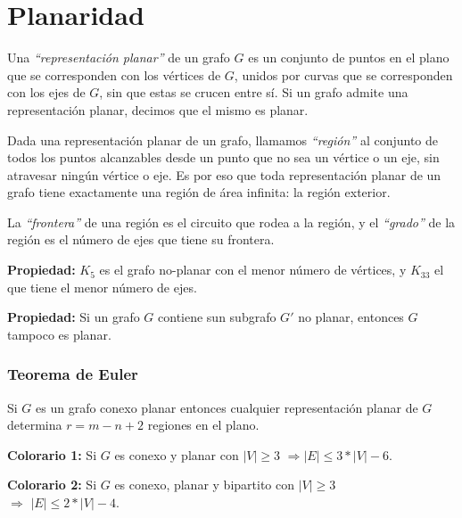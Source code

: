 \newpage
\section{Planaridad}

Una \emph{``representaci\'on planar''} de un grafo $G$ es un conjunto de puntos en el plano que se corresponden con los v\'ertices de $G$, unidos por curvas que se corresponden con los ejes de $G$, sin que estas se crucen entre s\'i. Si un grafo admite una representaci\'on planar, decimos que el mismo es planar.

Dada una representaci\'on planar de un grafo, llamamos \emph{``regi\'on''} al conjunto de todos los puntos alcanzables desde un punto que no sea un v\'ertice o un eje, sin atravesar ning\'un v\'ertice o eje. Es por eso que toda representaci\'on planar de un grafo tiene exactamente una regi\'on de \'area infinita: la regi\'on exterior.

La \emph{``frontera''} de una regi\'on es el circuito que rodea a la regi\'on, y el \emph{``grado''} de la regi\'on es el n\'umero de ejes que tiene su frontera.

\begin{badidea}
\textbf{Propiedad:} $K_5$ es el grafo no-planar con el menor n\'umero de v\'ertices, y $K_{33}$ el que tiene el menor n\'umero de ejes.
\end{badidea}

\begin{badidea}
\textbf{Propiedad:} Si un grafo $G$ contiene sun subgrafo $G'$ no planar, entonces $G$ tampoco es planar.
\end{badidea}

\subsubsection{Teorema de Euler}

Si $G$ es un grafo conexo planar entonces cualquier representaci\'on planar de $G$ determina $r = m - n + 2$ regiones en el plano.

\begin{badidea}
\textbf{Colorario 1:} Si $G$ es conexo y planar con $|V| \geq 3$ $\Rightarrow |E| \leq 3 * |V| - 6$.
\end{badidea}

\begin{badidea}
\textbf{Colorario 2:} Si $G$ es conexo, planar y bipartito con $|V| \geq 3$ \\ $\Rightarrow$ $|E| \leq 2 * |V| - 4$.
\end{badidea}

